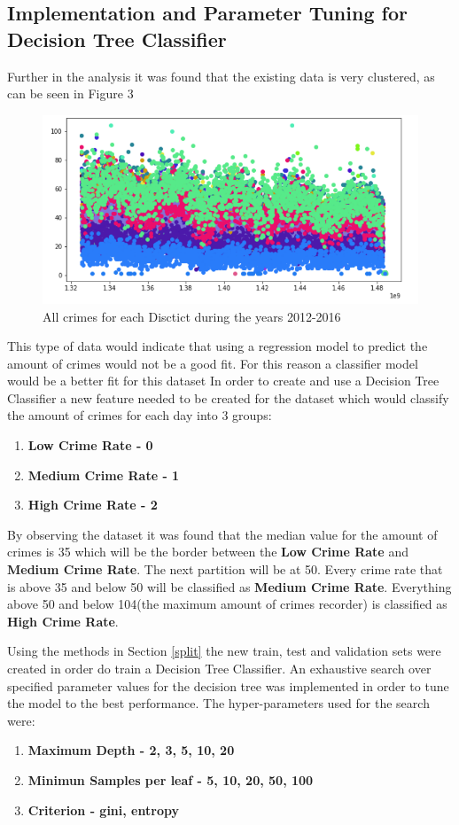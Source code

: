 \documentclass[a4paper, twocolumn]{article}
\begin{document}
\subsection{Implementation and Parameter Tuning for Decision Tree Classifier}
Further in the analysis it was found that the existing data is very clustered, as can be seen in Figure 3

\begin{figure}[h]
    \label{figure:}
    \includegraphics[scale=0.3]{fig5.png}
    \caption{All crimes for each Disctict during the years 2012-2016}
\end{figure}

This type of data would indicate that using a regression model to predict the amount of crimes would not be a good fit.
For this reason a classifier model would be a better fit for this dataset
In order to create and use a Decision Tree Classifier a new feature needed to be created for the dataset which
would classify the amount of crimes for each day into 3 groups:
\begin{enumerate}
    \item \textbf{Low Crime Rate - 0}
    \item \textbf{Medium Crime Rate - 1}
    \item \textbf{High Crime Rate - 2}
\end{enumerate}
By observing the dataset it was found that the median value for the amount of crimes is 35 which will be the border between the
\textbf{Low Crime Rate} and \textbf{Medium Crime Rate}. The next partition will be at 50. Every crime rate that is above 35 and 
below 50 will be classified as \textbf{Medium Crime Rate}. Everything above 50 and below 104(the maximum amount of crimes recorder)
is classified as \textbf{High Crime Rate}.

Using the methods in Section \ref{split} the new train, test and validation sets were created in order do train a Decision Tree Classifier.
An exhaustive search over specified parameter values for the decision tree was implemented in order to tune the model to the best performance.
The hyper-parameters used for the search were:
\begin{enumerate}
    \item \textbf{Maximum Depth - 2, 3, 5, 10, 20}
    \item \textbf{Minimun Samples per leaf - 5, 10, 20, 50, 100}
    \item \textbf{Criterion - gini, entropy}
\end{enumerate}
\end{document}
